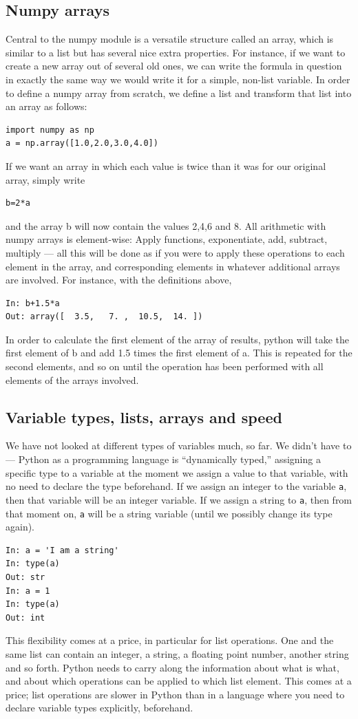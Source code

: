 \documentclass[twocolumn,apj]{openjournal}
\begin{document}
\subsection{Numpy arrays}
Central to the numpy module is a versatile structure called an array, which is similar to a list but has several nice extra properties. For instance, if we want to create a new array out of several old ones, we can write the formula in question in exactly the same way we would write it for a simple, non-list variable. In order to define a numpy array from scratch, we define a list and transform that list into an array as follows:
\begin{lstlisting}
import numpy as np
a = np.array([1.0,2.0,3.0,4.0])
 \end{lstlisting}
If we want an array in which each value is twice than it was for our original array, simply write
\begin{lstlisting}
b=2*a
 \end{lstlisting}
and the array b will now contain the values 2,4,6 and 8. All arithmetic with numpy arrays is element-wise: Apply functions, exponentiate, add, subtract, multiply --- all this will be done as if you were to apply these operations to each element in the array, and corresponding elements in whatever additional arrays are involved. For instance, with the definitions above, 
\begin{lstlisting}
In: b+1.5*a
Out: array([  3.5,   7. ,  10.5,  14. ])
\end{lstlisting}
In order to calculate the first element of the array of results, python will take the first element of b and add 1.5 times the first element of a. This is repeated for the second elements, and so on until the operation has been performed with all elements of the arrays involved.

\subsection{Variable types, lists, arrays and speed}

We have not looked at different types of variables much, so far. We didn't have to --- Python as a programming language is ``dynamically typed,'' assigning a specific type to a variable at the moment we assign a value to that variable, with no need to declare the type beforehand. If we assign an integer to the variable \verb|a|, then that variable will be an integer variable. If we assign a string to \verb|a|, then from that moment on, \verb|a| will be a string variable (until we possibly change its type again).
\begin{lstlisting}
In: a = 'I am a string'
In: type(a)
Out: str
In: a = 1
In: type(a)
Out: int
 \end{lstlisting}
This flexibility comes at a price, in particular for list operations. One and the same list can contain an integer, a string, a floating point number, another string and so forth. Python needs to carry along the information about what is what, and about which operations can be applied to which list element. This comes at a price; list operations are slower in Python than in a language where you need to declare variable types explicitly, beforehand.
\end{document}
